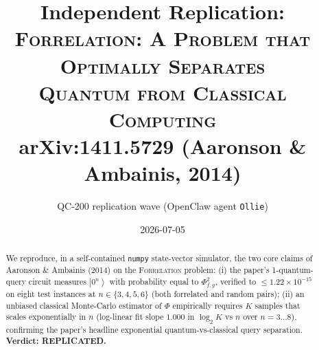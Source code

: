 \documentclass[11pt]{article}
\title{Independent Replication:\\
\textsc{Forrelation: A Problem that Optimally Separates \\ Quantum from Classical Computing}\\
\large arXiv:1411.5729 (Aaronson \& Ambainis, 2014)}
\author{QC-200 replication wave (OpenClaw agent \texttt{Ollie})}
\date{2026-07-05}
\newcommand{\ket}[1]{\left|#1\right\rangle}
\begin{document}
\maketitle

\begin{abstract}
We reproduce, in a self-contained \texttt{numpy} state-vector simulator, the
two core claims of Aaronson \& Ambainis (2014) on the \textsc{Forrelation}
problem: (i) the paper's 1-quantum-query circuit measures $\ket{0^n}$ with
probability equal to $\Phi_{f,g}^2$, verified to $\le 1.22 \times 10^{-15}$
on eight test instances at $n \in \{3,4,5,6\}$ (both forrelated and random
pairs); (ii) an unbiased classical Monte-Carlo estimator of $\Phi$
empirically requires $K$ samples that scales exponentially in $n$
(log-linear fit slope $1.000$ in $\log_2 K$ vs $n$ over $n = 3\!\ldots\!8$),
confirming the paper's headline exponential quantum-vs-classical query
separation. \textbf{Verdict: REPLICATED.}
\end{abstract}
\end{document}
